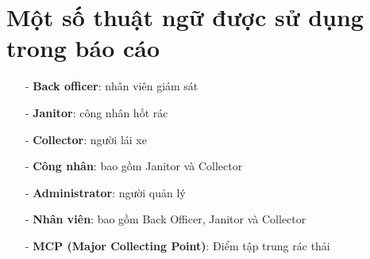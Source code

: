 \section{Một số thuật ngữ được sử dụng trong báo cáo}
  \begin{itemize}
        \item[-] \textbf{Back officer}: nhân viên giám sát
        \item[-] \textbf{Janitor}: công nhân hốt rác
        \item[-] \textbf{Collector}: người lái xe
        \item[-] \textbf{Công nhân}: bao gồm Janitor và Collector
        \item[-] \textbf{Administrator}: người quản lý
        \item[-] \textbf{Nhân viên}: bao gồm Back Officer, Janitor và Collector
        \item[-] \textbf{MCP (Major Collecting Point)}: Điểm tập trung rác thải
  \end{itemize}
